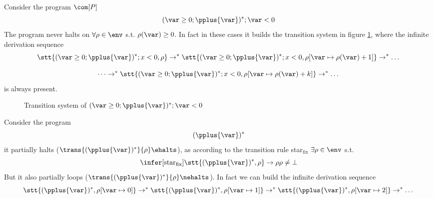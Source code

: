 \begin{example}\label{ex:neverhalts}
  Consider the program \(\com[P]\)
  \[(\var \geq 0; \pplus{\var})^*;\var < 0\] The program never halts on
  \(\forall \rho \in \env\) s.t. \(\rho(\var) \geq 0\). In fact in
  these cases it builds the transition system in figure
  \ref{fig:tsysnhalt}, where the infinite derivation sequence
  \[\stt{(\var \geq 0; \pplus{\var})^*; x < 0, \rho} \to^* \stt{(\var
      \geq 0; \pplus{\var})^*; x < 0, \rho[\var \mapsto \rho(\var) +
      1]} \to^* \dots\]
  
  \[\dots \to^* \stt{(\var \geq 0; \pplus{\var})^*; x < 0, \rho[\var
      \mapsto \rho(\var) + k]} \to^* \dots \] is always present.
  \begin{figure}
    \caption{Transition system of \((\var \geq 0; \pplus{\var})^*;\var
      < 0\)}\label{fig:tsysnhalt}
  \end{figure}
\end{example}

\begin{example}\label{ex:partial}
  Consider the program \[(\pplus{\var})^*\] it partially halts
  (\(\trans{(\pplus{\var})^*}{\rho}\ehalts\)), as according to the
  transition rule star\(_{\text{fix}}\) \(\exists \rho \in \env\) s.t.
  \[\infer[\text{star}_{\text{fix}}]{\stt{(\pplus{\var})^*, \rho} \to
    \rho}{\rho \neq \bot}\] But it also partially loops
(\(\trans{(\pplus{\var})^*}{\rho}\nehalts\)). In fact we can build the
infinite derivation
sequence\[\stt{(\pplus{\var})^*, \rho[\var\mapsto 0]} \to^*
  \stt{(\pplus{\var})^*, \rho[\var\mapsto 1]} \to^*
  \stt{(\pplus{\var})^*, \rho[\var\mapsto 2]} \to^* \dots\]
\end{example}

